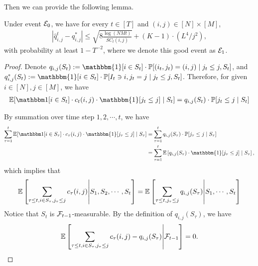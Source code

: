 Then we can provide the following lemma.
\begin{lemma}\label{lemma:concentration-formal}
Under event ${\mathcal{E}}_0$, we have for every $t \in [T]$ and $(i, j) \in [N] \times [M]$,
\begin{align*}
    \left|\hat q_{i,j}^t - q^*_{i,j}\right| \le \sqrt{8\frac{\log(NMt)}{SC_t(i,j)}} + (K-1)\cdot(L^4/j^2),
\end{align*}
with probability at least $1 - T^{-2}$, where we denote this good event as ${\mathcal{E}}_1$. 

\begin{proof}
Denote $q_{i,j}(S_t) := \mathbbm{1}[i \in S_t] \cdot \Prob[(i_t, j_t) = (i, j) \mid j_t \le j, S_t]$, and $q_{i,j}^*(S_t) := \mathbbm{1}[i \in S_t] \cdot \Prob[I_t \ni i, j_t = j \mid j_t \le j, S_t]$. Therefore, for given $i \in [N], j \in [M]$, we have
\begin{align*}
    \E[\1[i \in S_t] \cdot c_t(i,j)\cdot \mathbbm{1}[j_t \le j] \mid  S_t] = q_{i,j}(S_t) \cdot \Prob[j_t \le j \mid S_t]
\end{align*}

By summation over time step $1, 2, \cdots, t$, we have
\begin{align*}
    \sum_{\tau=1}^t \E[\1[i \in S_\tau]\cdot c_\tau(i,j)\cdot \mathbbm{1}[j_\tau \le j] \mid  S_\tau] &= \sum_{\tau=1}^t q_{i,j}(S_\tau)\cdot \Prob[j_\tau \le j \mid S_\tau] \\
    &= \sum_{\tau=1}^t \E\left[q_{i,j}(S_\tau)\cdot \mathbbm{1}[j_\tau \le j] \mid S_\tau\right],
\end{align*}
which implies that 
\begin{align*}
     \mathbb{E}\left[\sum_{\tau \le t, i \in S_\tau, j_\tau \le j}c_\tau(i,j) \middle| S_1, S_2, \cdots, S_t \right]  = \mathbb{E}\left[\sum_{\tau \le t, j_\tau \le j}
    q_{i,j}(S_\tau)\middle| S_1, \cdots, S_t\right]
\end{align*}
Notice that $S_t$ is ${\mathcal{F}}_{t-1}$-measurable. By the definition of $q_{i,j}(S_\tau)$, we have
\begin{align*}
    \mathbb{E}\left[\sum_{\tau \le t, i \in S_\tau, j_\tau \le j}c_\tau(i,j) -
    q_{i,j}(S_\tau) \middle| {\mathcal{F}}_{t-1} \right] = 0.
\end{align*}


\end{proof}
\end{lemma}
